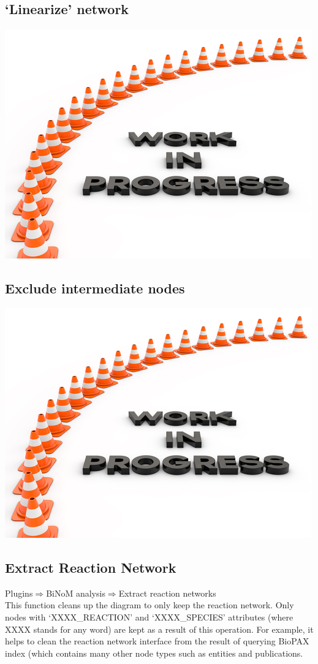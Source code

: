 \subsection{‘Linearize’ network}
\includegraphics{graphics/work_in_progress}
\subsection{Exclude intermediate nodes}
\includegraphics{graphics/work_in_progress}
\subsection{Extract Reaction Network}
Plugins$\Rightarrow$BiNoM analysis$\Rightarrow$Extract reaction networks\\
This function cleans up the diagram to only keep the reaction network. Only nodes with ‘XXXX\_REACTION’ and ‘XXXX\_SPECIES’ attributes (where XXXX stands for any word) are kept as a result of this operation. For example, it helps to clean the reaction network interface from the result of querying BioPAX index (which contains many other node types such as entities and publications.
